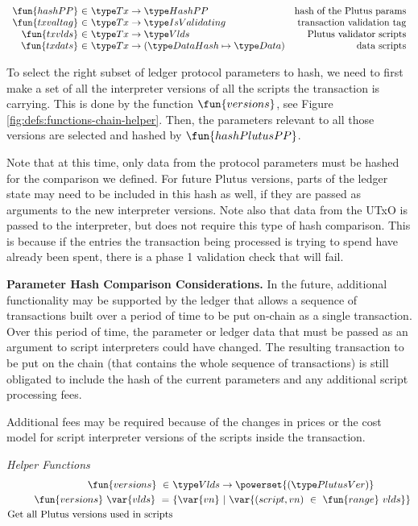 \begin{figure*}[htb]
\begin{equation*}
\begin{array}{r@{~\in~}lr}
      \fun{hashPP} & \Tx \to \HashPP & \text{hash of the Plutus params}\\
      \fun{txvaltag} & \Tx \to \IsValidating & \text{transaction validation tag}\\
      \fun{txvlds} & \Tx \to \Vlds & \text{Plutus validator scripts}\\
      \fun{txdats} & \Tx \to (\DataHash \mapsto \Data) & \text{data scripts}\\
    \end{array}
  \end{equation*}
  \caption{Definitions used in the UTxO transition system, cont.}
  \label{fig:defs:utxo-shelley-2}
\end{figure*}

To select the right subset of ledger protocol parameters to hash, we need to
first make a set of all the interpreter versions of all the scripts the
transaction is carrying. This is done by the function $\fun{versions}$,
see Figure \ref{fig:defs:functions-chain-helper}. Then, the parameters
relevant to all those versions are selected and hashed by $\fun{hashPlutusPP}$.

Note that at this time, only data from the protocol parameters must be hashed
for the comparison we defined. For future Plutus versions, parts of the ledger
state may need to be included in this hash as well, if they are passed as
arguments to the new interpreter versions. Note also that data from the UTxO
is passed to the interpreter, but does not require this type of hash comparison.
This is because if the entries the transaction being processed is trying to
spend have already been spent, there is a phase 1 validation check that
will fail.

\textbf{Parameter Hash Comparison Considerations.}
In the future, additional functionality may be supported by the ledger that
allows a sequence of transactions built over a period of time to be put on-chain
as a single transaction. Over this period of time, the parameter or ledger
data that must be passed as an argument to script interpreters could have changed.
The resulting transaction to be put on the chain (that contains the whole sequence of
transactions) is still obligated to include the hash of the current parameters
and any additional script processing fees.

Additional fees may be required because of the changes in prices or the cost model
for script interpreter versions of the scripts inside the transaction.

\begin{figure*}[htb]
  \emph{Helper Functions}
  \begin{align*}
    \fun{versions} ~\in~& \Vlds \to \powerset{(\PlutusVer)} \\
    \fun{versions}~ \var{vlds} ~=~ & \{ \var{vn} ~\vert~
      \var{(script,vn)~\in~ \fun{range}~{vlds}} \}\\
    \text{Get all Plutus versions used in scripts} \\
  \end{align*}
  \caption{Plutus Versions}
  \label{fig:defs:functions-chain-helper}
\end{figure*}

